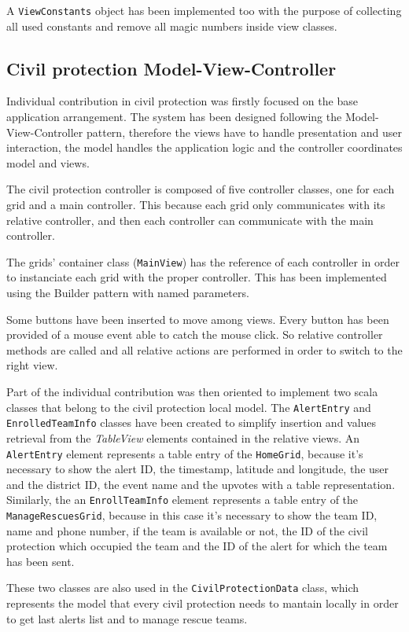 \documentclass[a4paper,12pt]{report}
\begin{document}
A \texttt{ViewConstants} object has been implemented too with the purpose of collecting all used constants and remove all magic numbers inside view classes.

\subsection{Civil protection Model-View-Controller}
Individual contribution in civil protection was firstly focused on the base application arrangement. The system has been designed following the Model-View-Controller pattern, therefore the views have to handle presentation and user interaction, the model handles the application logic and the controller coordinates model and views.

The civil protection controller is composed of five controller classes, one for each grid and a main controller. This because each grid only communicates with its relative controller, and then each controller can communicate with the main controller.

The grids' container class (\texttt{MainView}) has the reference of each controller in order to instanciate each grid with the proper controller. This has been implemented using the Builder pattern with named parameters.

Some buttons have been inserted to move among views. Every button has been provided of a mouse event able to catch the mouse click. So relative controller methods are called and all relative actions are performed in order to switch to the right view.

Part of the individual contribution was then oriented to implement two scala classes that belong to the civil protection local model.
The \texttt{AlertEntry} and \texttt{EnrolledTeamInfo} classes have been created to simplify insertion and values retrieval from the \textit{TableView} elements contained in the relative views. An \texttt{AlertEntry} element represents a table entry of the \texttt{HomeGrid}, because it's necessary to show the alert ID, the timestamp, latitude and longitude, the user and the district ID, the event name and the upvotes with a table representation. Similarly, the an \texttt{EnrollTeamInfo} element represents a table entry of the \texttt{ManageRescuesGrid}, because in this case it's necessary to show the team ID, name and phone number, if the team is available or not, the ID of the civil protection which occupied the team and the ID of the alert for which the team has been sent.

These two classes are also used in the \texttt{CivilProtectionData} class, which represents the model that every civil protection needs to mantain locally in order to get last alerts list and to manage rescue teams.
\end{document}
